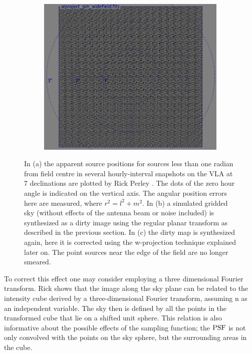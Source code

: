 \begin{figure}[ht!]
\begin{mdframed}
\begin{subfigure}[b]{0.49\textwidth}
      \caption{}
    \end{subfigure}
    \begin{subfigure}[b]{0.49\textwidth}
      \centering
      \includegraphics[width=\textwidth]{images/widefield_corrected_meerkat.png}
      \caption{}
    \end{subfigure}
    \caption[Apparent shift in source position and resulting decorrelation]{In (a) the apparent source positions for sources less than one radian from field centre in 
    several hourly-interval snapshots on the VLA at 7 declinations are plotted by Rick Perley \cite[Lecture 19]{taylor1999synthesis}. The dots of the zero hour angle is indicated on the vertical 
    axis. The angular position errors here are measured, where $r^2=l^2+m^2$. In (b) a simulated gridded sky (without effects of the antenna beam or noise included) is 
    synthesized as a dirty image using the regular planar transform as described in the previous section. In (c) the dirty map is synthesized again, here it is 
    corrected using the w-projection technique explained later on. The point sources near the edge of the field are no longer smeared.}
    \label{fig_position_shifts_and_decorrelation}
  \end{mdframed}
\end{figure}

To correct this effect one may consider employing a three dimensional Fourier transform. Rick \cite[Lecture 19]{taylor1999synthesis} shows that the 
image along the sky plane can be related to the intensity cube derived by a three-dimensional Fourier transform, assuming n as an independent variable. 
The sky then is defined by all the points in the transformed cube that lie on a shifted unit sphere. This relation is also informative about the possible 
effects of the sampling function; the $\textrm{PSF}$ is not only convolved with the points on the sky sphere, but the surrounding areas in the cube.

